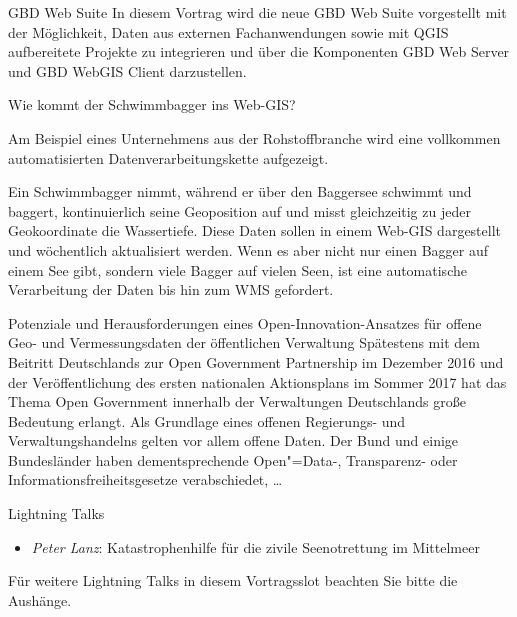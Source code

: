 \renewcommand{\conferenceDay}{\donnerstag}

%
{GBD Web Suite}{}%
{
In diesem Vortrag wird die neue GBD Web Suite vorgestellt mit der Möglichkeit, Daten aus externen
Fachanwendungen sowie mit QGIS aufbereitete Projekte zu integrieren und über die Komponenten GBD
Web Server und GBD WebGIS Client darzustellen.%
}

%
{Wie kommt der Schwimmbagger ins Web-GIS?}%
{}%
{%
Am Beispiel eines Unternehmens aus der Rohstoffbranche wird eine vollkommen automatisierten
Datenverarbeitungskette aufgezeigt.

Ein Schwimmbagger nimmt, während er über den Baggersee schwimmt
und baggert, kontinuierlich seine Geoposition auf und misst gleichzeitig zu jeder Geokoordinate die
Wassertiefe. Diese Daten sollen in einem Web-GIS dargestellt und wöchentlich aktualisiert werden.
Wenn es aber nicht nur einen Bagger auf einem See gibt, sondern viele Bagger auf vielen Seen, ist
eine automatische Verarbeitung der Daten bis hin zum WMS gefordert.%
}


%
{Potenziale und Herausforderungen eines Open-Innovation-Ansatzes für offene Geo- und
Vermessungsdaten der öffentlichen Verwaltung}%
{}%
{%
Spätestens mit dem Beitritt Deutschlands zur Open Government Partnership im Dezember 2016 und der
Veröffentlichung des ersten nationalen Aktionsplans im Sommer 2017 hat das Thema Open Government
innerhalb der Verwaltungen Deutschlands große Bedeutung erlangt. Als Grundlage eines offenen
Regierungs- und Verwaltungshandelns gelten vor allem offene Daten. Der Bund und einige
Bundesländer haben dementsprechende Open"=Data-, Transparenz- oder Informationsfreiheitsgesetze
verabschiedet, \dots%
}

\abstractAPH{}%
{Lightning Talks}%
{}%
{%
  \vspace{-2em}
  \begin{itemize}
    \item \emph{Peter Lanz}: Katastrophenhilfe für die zivile Seenotrettung im Mittelmeer
  \end{itemize}

  \noindent Für weitere Lightning Talks in diesem Vortragsslot beachten Sie bitte die Aushänge.
}

